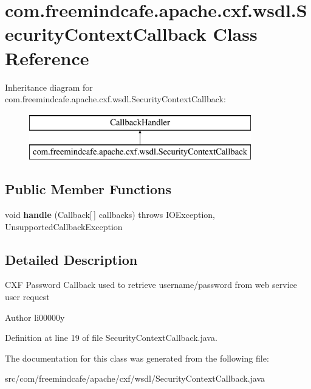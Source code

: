 \hypertarget{classcom_1_1freemindcafe_1_1apache_1_1cxf_1_1wsdl_1_1_security_context_callback}{}\section{com.\+freemindcafe.\+apache.\+cxf.\+wsdl.\+Security\+Context\+Callback Class Reference}
\label{classcom_1_1freemindcafe_1_1apache_1_1cxf_1_1wsdl_1_1_security_context_callback}
Inheritance diagram for com.\+freemindcafe.\+apache.\+cxf.\+wsdl.\+Security\+Context\+Callback\+:\begin{figure}[H]
\begin{center}
\leavevmode
\includegraphics[height=2.000000cm]{classcom_1_1freemindcafe_1_1apache_1_1cxf_1_1wsdl_1_1_security_context_callback}
\end{center}
\end{figure}
\subsection*{Public Member Functions}
\begin{DoxyCompactItemize}
\item 
\hypertarget{classcom_1_1freemindcafe_1_1apache_1_1cxf_1_1wsdl_1_1_security_context_callback_a396d227ef83a6b37a561b8d47f10b72b}{}void {\bfseries handle} (Callback\mbox{[}$\,$\mbox{]} callbacks)  throws I\+O\+Exception, 			\+Unsupported\+Callback\+Exception \label{classcom_1_1freemindcafe_1_1apache_1_1cxf_1_1wsdl_1_1_security_context_callback_a396d227ef83a6b37a561b8d47f10b72b}

\end{DoxyCompactItemize}


\subsection{Detailed Description}
C\+X\+F Password Callback used to retrieve username/password from web service user request

\begin{DoxyAuthor}{Author}
li00000y 
\end{DoxyAuthor}


Definition at line 19 of file Security\+Context\+Callback.\+java.



The documentation for this class was generated from the following file\+:\begin{DoxyCompactItemize}
\item 
src/com/freemindcafe/apache/cxf/wsdl/Security\+Context\+Callback.\+java\end{DoxyCompactItemize}
